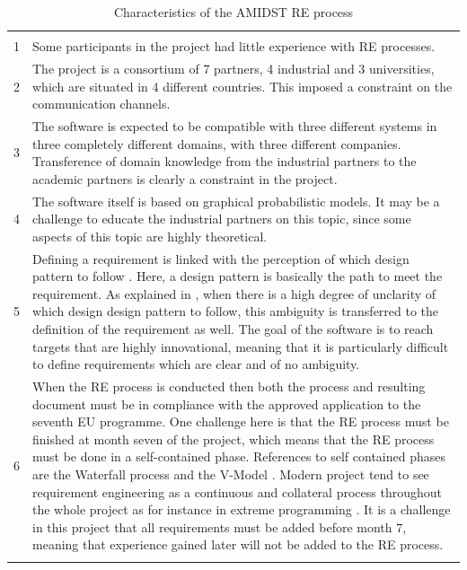 \documentclass[11pt, oneside]{article}   	%
\begin{document}
\begin{table}
\caption{Characteristics of the AMIDST RE process}
\vspace{1ex}
\begin{tabular}{
>{\raggedright\hspace{0pt}}m{8mm}%
>{\raggedright\hspace{0pt}}p{120mm}}
\hline
& \tabularnewline
1 & Some participants in the project had little experience with RE processes.  \tabularnewline
2 & The project is a consortium of 7 partners, 4 industrial and 3 universities, which are situated in 4 different countries.  This imposed a constraint on the communication channels. \tabularnewline
3 & The software is expected to be compatible with three different systems in three completely different domains, with three different companies. Transference of domain knowledge from the industrial partners to the academic partners is clearly a constraint in the project. \tabularnewline
4 & The software itself is based on graphical probabilistic models. It may be a challenge to educate the industrial partners on this topic, since some aspects of this topic are highly theoretical.  \tabularnewline
5 & Defining a requirement is linked with the perception of which design pattern to follow \cite{Ral13}.  Here, a design pattern is basically the path to meet the requirement.  As explained in \cite{Ral13}, when there is a high degree of unclarity of which design design pattern to follow, this ambiguity is transferred to the definition of the requirement as well.  The goal of the software is to reach targets that are highly innovational, meaning that it is particularly difficult to define requirements which are clear and of no ambiguity. \tabularnewline
6 & When the RE process is conducted then both the process and resulting document must be in compliance with the approved application to the seventh EU programme. One challenge here is that the RE process must be finished at month seven of the project, which means that the RE process must be done in a self-contained phase. References to self contained phases are the Waterfall process \cite{Roy70} and the V-Model \cite{For91}.  Modern project tend to see requirement engineering as a continuous and collateral process throughout the whole project as for instance in extreme programming \cite{Bec99}.  It is a challenge in this project that all requirements must be added before month 7, meaning that experience gained later will not be added to the RE process.
\tabularnewline
& \tabularnewline
\hline
\end{tabular}
\label{tab:characteristic}
\end{table}
\end{document}
